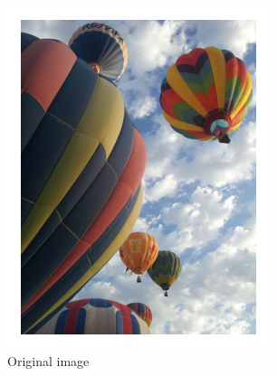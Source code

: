 \newpage
\vfill
\begin{figure}[ht]
	\begin{minipage}[b]{0.45\linewidth}
	\centering
	\includegraphics[width=\textwidth]{figures/balloons_colors.pdf}
	\caption*{Original image}
	\end{minipage}
	\hspace{0.5cm}
	\begin{minipage}[b]{0.45\linewidth}
	\centering

\end{minipage}
\end{figure}
